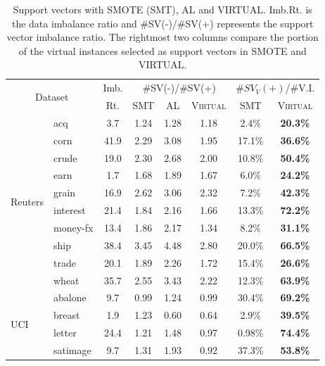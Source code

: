 \begin{table}[t!]
\centering \small
\caption{Support vectors with SMOTE (SMT), AL and VIRTUAL. Imb.Rt. is the data imbalance ratio and
\#SV(-)/\#SV(+) represents the support vector imbalance ratio. The rightmost two columns compare the portion of the virtual instances selected as support vectors in SMOTE and VIRTUAL.}
\small
\begin{tabular}{l@{\hspace{1mm}}|l@{\hspace{1mm}}|c@{\hspace{1mm}}|c@{\hspace{1mm}}|c@{\hspace{1mm}}|c@{\hspace{1mm}}|c@{\hspace{1mm}}|c}
\hline
\multicolumn{2}{c|}{\multirow{2}{1cm}{Dataset}}&Imb.&\multicolumn{3}{c|}{\#SV(-)/\#SV(+)}&\multicolumn{2}{c}{\#$SV_V(+)$/\#V.I.}\\\cline{4-8}
\multicolumn{2}{c|}{}&Rt.&SMT&AL&\textsc{Virtual}&SMT&\textsc{Virtual}\\
\hline\hline
\multirow{10}{2mm}{\begin{sideways}\parbox{13mm}{Reuters}\end{sideways}}
&acq&3.7&1.24&1.28&1.18&2.4\%&\textbf{20.3\%}\\
&corn&41.9&2.29&3.08&1.95&17.1\%&\textbf{36.6\%}\\
&crude&19.0&2.30&2.68&2.00&10.8\%&\textbf{50.4\%}\\
&earn&1.7&1.68&1.89&1.67&6.0\%&\textbf{24.2\%}\\
&grain&16.9&2.62&3.06&2.32&7.2\%&\textbf{42.3\%}\\
&interest&21.4&1.84&2.16&1.66&13.3\%&\textbf{72.2\%}\\
&money-fx&13.4&1.86&2.17&1.34&8.2\%&\textbf{31.1\%}\\
&ship&38.4&3.45&4.48&2.80&20.0\%&\textbf{66.5\%}\\
&trade&20.1&1.89&2.26&1.72&15.4\%&\textbf{26.6\%}\\
&wheat&35.7&2.55&3.43&2.22&12.3\%&\textbf{63.9\%}\\
\hline\hline
\multirow{4}{2mm}{\begin{sideways}\parbox{5mm}{UCI}\end{sideways}}
&abalone&9.7&0.99&1.24&0.99&30.4\%&\textbf{69.2\%}\\
&breast&1.9&1.23&0.60&0.64&2.9\%&\textbf{39.5\%}\\
&letter&24.4&1.21&1.48&0.97&0.98\%&\textbf{74.4\%}\\
&satimage&9.7&1.31&1.93&0.92&37.3\%&\textbf{53.8\%}\\
\hline
\end{tabular}
\label{tbl:res_svs}
\end{table}

